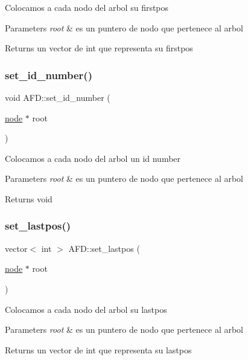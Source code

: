 Colocamos a cada nodo del arbol su firstpos 
\begin{DoxyParams}{Parameters}
{\em root} & es un puntero de nodo que pertenece al arbol \\
\hline
\end{DoxyParams}
\begin{DoxyReturn}{Returns}
un vector de int que representa su firstpos 
\end{DoxyReturn}
\hypertarget{class_a_f_d_a28ca2cf650830a32d1e1716f4a3c4e78}{}\label{class_a_f_d_a28ca2cf650830a32d1e1716f4a3c4e78} 
\subsubsection{\texorpdfstring{set\+\_\+id\+\_\+number()}{set\_id\_number()}}
{\footnotesize\ttfamily void A\+F\+D\+::set\+\_\+id\+\_\+number (\begin{DoxyParamCaption}\item[{\hyperlink{structnode}{node} $\ast$}]{root }\end{DoxyParamCaption})}

Colocamos a cada nodo del arbol un id number 
\begin{DoxyParams}{Parameters}
{\em root} & es un puntero de nodo que pertenece al arbol \\
\hline
\end{DoxyParams}
\begin{DoxyReturn}{Returns}
void 
\end{DoxyReturn}
\hypertarget{class_a_f_d_a6ebbbeb7971579ee7085730c52ee7dc5}{}\label{class_a_f_d_a6ebbbeb7971579ee7085730c52ee7dc5} 
\subsubsection{\texorpdfstring{set\+\_\+lastpos()}{set\_lastpos()}}
{\footnotesize\ttfamily vector$<$ int $>$ A\+F\+D\+::set\+\_\+lastpos (\begin{DoxyParamCaption}\item[{\hyperlink{structnode}{node} $\ast$}]{root }\end{DoxyParamCaption})}

Colocamos a cada nodo del arbol su lastpos 
\begin{DoxyParams}{Parameters}
{\em root} & es un puntero de nodo que pertenece al arbol \\
\hline
\end{DoxyParams}
\begin{DoxyReturn}{Returns}
un vector de int que representa su lastpos 
\end{DoxyReturn}
\hypertarget{class_a_f_d_a2d612d265dfc6864e7563d4e242ef100}{}\label{class_a_f_d_a2d612d265dfc6864e7563d4e242ef100} 
